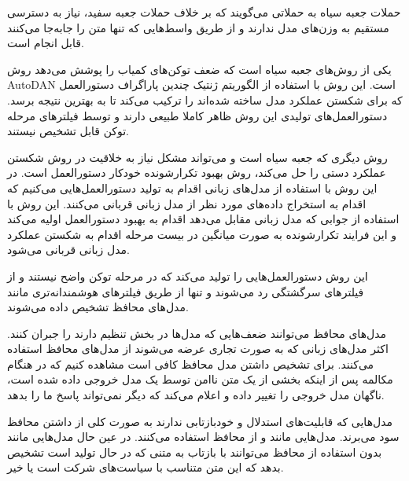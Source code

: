 
حملات جعبه سیاه به حملاتی می‌گویند که بر خلاف حملات جعبه سفید، نیاز به دسترسی مستقیم به وزن‌های مدل ندارند و از طریق واسط‌هایی که تنها متن را جابه‌جا می‌کنند قابل انجام است.

یکی از روش‌های جعبه سیاه است که ضعف توکن‌های کمیاب  را پوشش می‌دهد روش AutoDAN  است. این روش با استفاده از الگوریتم ژنتیک چندین پاراگراف دستورالعمل که برای شکستن عملکرد مدل ساخته شده‌اند را ترکیب می‌کند تا به بهترین نتیجه برسد. دستورالعمل‌های تولیدی این روش ظاهر کاملا طبیعی دارند و توسط فیلترهای مرحله توکن قابل تشخیص نیستند.

روش دیگری که جعبه سیاه است و می‌تواند مشکل نیاز به خلاقیت در روش شکستن عملکرد دستی را حل می‌کند، روش بهبود تکرارشونده خودکار دستورالعمل است. در این روش با استفاده از مدل‌های زبانی اقدام به تولید دستورالعمل‌هایی می‌کنیم که اقدام به استخراج داده‌های مورد نظر از مدل زبانی قربانی می‌کنند. این روش با استفاده از جوابی که مدل زبانی مقابل می‌دهد اقدام به بهبود دستورالعمل اولیه می‌کند و این فرایند تکرارشونده به صورت میانگین در بیست مرحله اقدام به شکستن عملکرد مدل زبانی قربانی می‌شود.

این روش دستورالعمل‌هایی را تولید می‌کند که در مرحله توکن واضح نیستند و از فیلترهای سرگشتگی رد می‌شوند و تنها از طریق فیلترهای هوشمندانه‌تری مانند مدل‌های محافظ تشخیص داده می‌شوند.



مدل‌های محافظ می‌توانند ضعف‌هایی که مدل‌ها در بخش تنظیم دارند را جبران کنند. اکثر مدل‌های زبانی که به صورت تجاری عرضه می‌شوند از مدل‌های محافظ استفاده می‌کنند. برای تشخیص داشتن مدل محافظ کافی است مشاهده کنیم که در هنگام مکالمه پس از اینکه بخشی از یک متن ناامن توسط یک مدل خروجی داده شده است، ناگهان مدل خروجی را تغییر داده و اعلام می‌کند که دیگر نمی‌تواند پاسخ ما را بدهد.

مدل‌هایی که قابلیت‌های استدلال و خودبازتابی ندارند به صورت کلی از داشتن محافظ سود می‌برند. مدل‌هایی مانند  و  از محافظ استفاده می‌کنند. در عین حال مدل‌هایی مانند  بدون استفاده از محافظ می‌توانند با بازتاب به متنی که در حال تولید است تشخیص بدهد که این متن متناسب با سیاست‌های شرکت است یا خیر.

